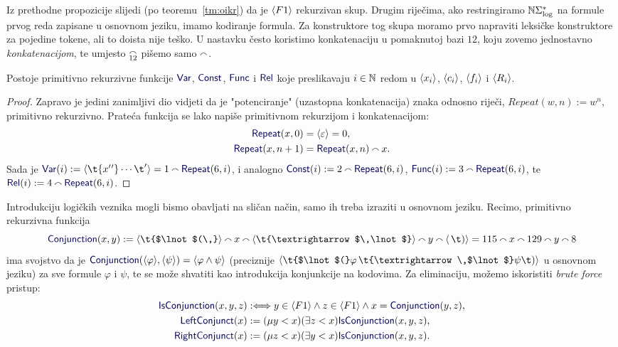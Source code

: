 Iz prethodne propozicije slijedi (po teoremu~\ref{tm:oikr}) da je $\langle F1\rangle$ rekurzivan skup. Drugim riječima, ako restringiramo ${\mathbb N}\Sigma_{\log}^*$ na formule prvog reda zapisane u osnovnom jeziku, imamo kodiranje formula. Za konstruktore tog skupa moramo prvo napraviti leksičke konstruktore za pojedine tokene, ali to doista nije teško. U nastavku često koristimo konkatenaciju u pomaknutoj bazi $12$, koju zovemo jednostavno \emph{konkatenacijom}, te umjesto $\conc{12}$ pišemo samo $\conc{}$.

\begin{lema}[{name=[primitivna rekurzivnost leksičke strukture formula prvog reda]}]\label{lm:lexF1}
Postoje primitivno rekurzivne funkcije $\f{Var}$, $\f{Const}$, $\f{Func}$ i $\f{Rel}$ koje preslikavaju $i\in{\mathbb N}$ redom u $\langle x_i\rangle$, $\langle c_i\rangle$, $\langle f_i\rangle$ i $\langle R_i\rangle$.
\end{lema}
\begin{proof}
Zapravo je jedini zanimljivi dio vidjeti da je "potenciranje" (uzastopna konkatenacija) znaka odnosno riječi, $Repeat(w,n):=w^n$, primitivno rekurzivno. Prateća funkcija se lako napiše primitivnom rekurzijom i konkatenacijom:
\begin{align}
    \f{Repeat}(x,0)&=\kr{\varepsilon}=0\text,\\
    \f{Repeat}(x,n+1)&=\f{Repeat}(x,n)\conc{}x\text.
\end{align}
Sada je $\f{Var}(i):=\kr{\t{x{}'{}'}\dotsm\t'}=1\conc{}\f{Repeat}(6,i)$, i analogno $\f{Const}(i):=2\conc{}\f{Repeat}(6,i)$, $\f{Func}(i):=3\conc{}\f{Repeat}(6,i)$, te $\f{Rel}(i):=4\conc{}\f{Repeat}(6,i)$.
\end{proof}

Introdukciju logičkih veznika mogli bismo obavljati na sličan način, samo ih treba izraziti u osnovnom jeziku. Recimo, primitivno rekurzivna funkcija
\begin{equation}\label{eq:Conjunction}
    \f{Conjunction}(x,y):=
    \kr{\t{$\lnot$(\,}}\conc{}
    x\conc{}
    \kr{\t{\textrightarrow$\,\lnot$}}\conc{}
    y\conc{}
    \kr{\,\t)}=
    115\conc{}
    x\conc{}
    129\conc{}
    y\conc{}
    8
\end{equation}
ima svojstvo da je $\f{Conjunction}(\kr{\varphi},\kr{\psi})=\kr{\varphi\land\psi}$ (preciznije $\kr{\t{$\lnot$(}\varphi\,\t{\textrightarrow\,$\lnot$}\psi\t)}$ u osnovnom jeziku) za sve formule $\varphi$ i $\psi$, te se može shvatiti kao introdukcija konjunkcije na kodovima. Za eliminaciju, možemo iskoristiti \emph{brute force} pristup:
\begin{align}
    \f{IsConjunction}(x,y,z)&:\Longleftrightarrow y\in\kr{F1}\land z\in\kr{F1}\land x=\f{Conjunction}(y,z)\text,
\\\label{eq:lconj}
    \f{LeftConjunct}(x)&:=(\mu y<x)(\exists z<x)\f{IsConjunction}(x,y,z)\text,
\\\label{eq:rconj}
    \f{RightConjunct}(x)&:=(\mu z<x)(\exists y<x)\f{IsConjunction}(x,y,z)\text.
\end{align}

